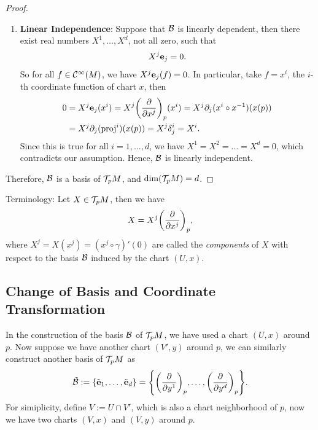 \begin{proof}
\begin{enumerate}
		\item \textbf{Linear Independence}: Suppose that \(\mathcal B\) is linearly dependent, then there exist real numbers \(X^1, \ldots, X^d\), not all zero, such that
		      \begin{equation}
			      X^j \vb{e}_j = 0.
		      \end{equation}
		      So for all \(f \in \mathcal C^\infty(M)\), we have \(X^j \vb{e}_j(f) = 0\). In particular, take \(f = x^i\), the \(i\)-th coordinate function of chart \(x\), then
		      \begin{align*}
			      0 & = X^j \vb{e}_j(x^i) = X^j \qty(\pdv{x^j})_p (x^i) = X^j \partial_j (x^i \circ x^{-1})(x(p)) \\
			        & = X^j \partial_j (\operatorname{proj}^i) (x(p)) = X^j \delta_j^i = X^i.
		      \end{align*}
		      Since this is true for all \(i = 1, \ldots, d\), we have \(X^1 = X^2 = \ldots = X^d = 0\), which contradicts our assumption. Hence, \(\mathcal B\) is linearly independent.
	\end{enumerate}
	Therefore, \(\mathcal B\) is a basis of \(\mathcal T_p M\), and \(\dim(\mathcal T_p M) = d\).
\end{proof}
Terminology: Let \(X \in \mathcal T_p M\), then we have
\begin{equation}
	X = X^j \qty(\pdv{x^j})_p,
\end{equation}
where \(X^j = X(x^j) = (x^j \circ \gamma)'(0)\) are called the \emph{components} of \(X\) with respect to the basis \(\mathcal B\) induced by the chart \((U, x)\).

\subsection{Change of Basis and Coordinate Transformation}

In the construction of the basis \(\mathcal B\) of \(\mathcal T_p M\), we have used a chart \((U, x)\) around \(p\). Now suppose we have another chart \((V', y)\) around \(p\), we can similarly construct another basis of \(\mathcal T_p M\) as
\begin{equation}
	\tilde{\mathcal B} := \qty{\tilde{\vb{e}}_1, \ldots, \tilde{\vb{e}}_d} = \qty{\qty(\pdv{y^1})_p, \ldots, \qty(\pdv{y^d})_p}.
\end{equation}
For simiplicity, define \(V := U \cap V'\), which is also a chart neighborhood of \(p\), now we have two charts \((V, x)\) and \((V, y)\) around \(p\).

